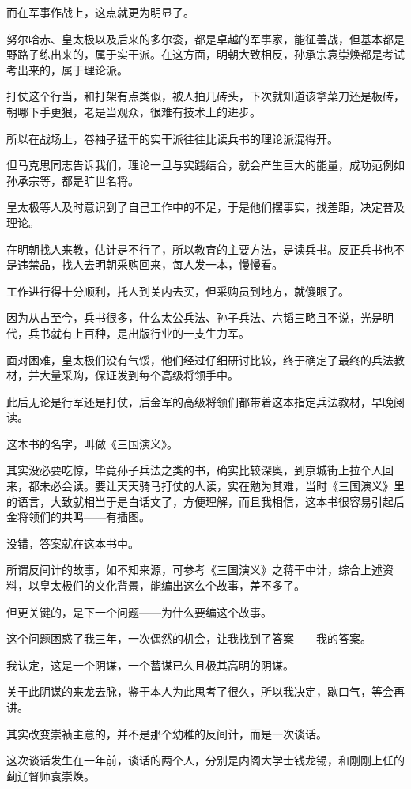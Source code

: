 \begin{multicols}{\theparacolNo}
而在军事作战上，这点就更为明显了。

努尔哈赤、皇太极以及后来的多尔衮，都是卓越的军事家，能征善战，但基本都是野路子练出来的，属于实干派。在这方面，明朝大致相反，孙承宗袁崇焕都是考试考出来的，属于理论派。

打仗这个行当，和打架有点类似，被人拍几砖头，下次就知道该拿菜刀还是板砖，朝哪下手更狠，老是当观众，很难有技术上的进步。

所以在战场上，卷袖子猛干的实干派往往比读兵书的理论派混得开。

但马克思同志告诉我们，理论一旦与实践结合，就会产生巨大的能量，成功范例如孙承宗等，都是旷世名将。

皇太极等人及时意识到了自己工作中的不足，于是他们摆事实，找差距，决定普及理论。

在明朝找人来教，估计是不行了，所以教育的主要方法，是读兵书。反正兵书也不是违禁品，找人去明朝采购回来，每人发一本，慢慢看。

工作进行得十分顺利，托人到关内去买，但采购员到地方，就傻眼了。

因为从古至今，兵书很多，什么太公兵法、孙子兵法、六韬三略且不说，光是明代，兵书就有上百种，是出版行业的一支生力军。

面对困难，皇太极们没有气馁，他们经过仔细研讨比较，终于确定了最终的兵法教材，并大量采购，保证发到每个高级将领手中。

此后无论是行军还是打仗，后金军的高级将领们都带着这本指定兵法教材，早晚阅读。

这本书的名字，叫做《三国演义》。

其实没必要吃惊，毕竟孙子兵法之类的书，确实比较深奥，到京城街上拉个人回来，都未必会读。要让天天骑马打仗的人读，实在勉为其难，当时《三国演义》里的语言，大致就相当于是白话文了，方便理解，而且我相信，这本书很容易引起后金将领们的共鸣——有插图。

没错，答案就在这本书中。

所谓反间计的故事，如不知来源，可参考《三国演义》之蒋干中计，综合上述资料，以皇太极们的文化背景，能编出这么个故事，差不多了。

但更关键的，是下一个问题——为什么要编这个故事。

这个问题困惑了我三年，一次偶然的机会，让我找到了答案——我的答案。

我认定，这是一个阴谋，一个蓄谋已久且极其高明的阴谋。

关于此阴谋的来龙去脉，鉴于本人为此思考了很久，所以我决定，歇口气，等会再讲。

其实改变崇祯主意的，并不是那个幼稚的反间计，而是一次谈话。

这次谈话发生在一年前，谈话的两个人，分别是内阁大学士钱龙锡，和刚刚上任的蓟辽督师袁崇焕。


\end{multicols}
